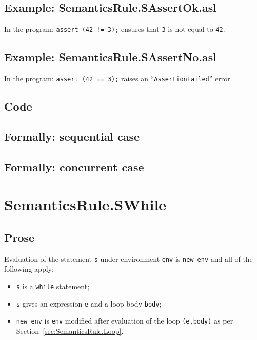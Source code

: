 \documentclass{book}
\begin{document}
    \subsection{Example: SemanticsRule.SAssertOk.asl}
    In the program:
    \texttt{assert (42 != 3);} ensures that \texttt{3} is not equal to \texttt{42}.

    \subsection{Example: SemanticsRule.SAssertNo.asl}
    In the program:
    \texttt{assert (42 == 3);} raises an ``\texttt{AssertionFailed}'' error.

  \subsection{Code}

\begin{emptyformal}
  \subsection{Formally: sequential case}

  \subsection{Formally: concurrent case}
\end{emptyformal}


\section{SemanticsRule.SWhile \label{sec:SemanticsRule.SWhile}}

    \subsection{Prose}
  Evaluation of the statement \texttt{s} under environment \texttt{env} is
\texttt{new\_env} and all of the following apply:
    \begin{itemize}
    \item \texttt{s} is a \texttt{while} statement;
    \item \texttt{s} gives an expression \texttt{e} and a loop body \texttt{body};
    \item \texttt{new\_env} is \texttt{env} modified after evaluation of the loop \texttt{(e,body)} as per Section~\ref{sec:SemanticsRule.Loop}.
    \end{itemize}
\end{document}
